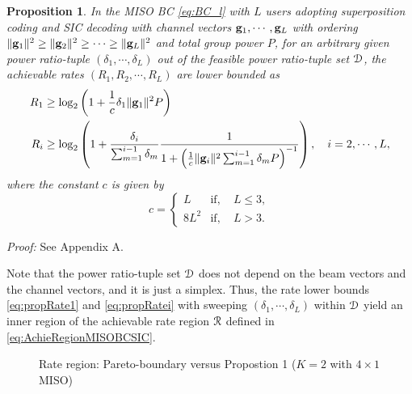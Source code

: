 \documentclass[11pt, draft, onecolumn ]{IEEEtran}
\def\scalefig#1{\epsfxsize #1\textwidth}
\newtheorem{proposition}{Proposition}
\begin{document}
\begin{proposition} \label{pro:proposition2}
    In the MISO BC \eqref{eq:BC_l} with $L$ users adopting superposition coding and SIC decoding with  channel vectors ${\bf g}_1, \cdots, {\bf g}_L$ with ordering
$\|{\bf g}_1\|^2 \geq \|{\bf g}_2\|^2 \geq \cdots  \geq \|{\bf g}_L\|^2$ and total group power $P$,  for an arbitrary given power ratio-tuple  $(\delta_1, \cdots, \delta_L)$ out of the feasible power ratio-tuple set ${\cal D}$, %
the achievable rates  $(R_1, R_2, \cdots, R_L)$   are lower bounded as
\begin{align}
    R_1 &\geq \log_2 \left( 1 + \frac{1}{c} \delta_1 \|{\bf g}_1\|^2 P \right)  \label{eq:propRate1}\\
    R_i &\geq \log_2 \left( 1 + \frac{\delta_i}{\sum_{m=1}^{i-1} \delta_m} \frac{1}{1 + \left(\frac{1}{c} \|{\bf g}_i\|^2\sum_{m=1}^{i-1} \delta_m P \right)^{-1}}\right),
    \quad i = 2, \cdots, L, \label{eq:propRatei}
\end{align}
 where the constant $c$ is given by
\begin{equation}  \label{eq:Prop1constanC}
   c = \left\{ \begin{array}{ll}
                  L & \mbox{if}, \quad L \leq 3, \\
                  8L^2 & \mbox{if}, \quad L > 3.
                \end{array}
    \right.
\end{equation}
\end{proposition}



{\em Proof:} See Appendix A.






Note that the power ratio-tuple set ${\cal D}$ does not
depend on the beam vectors and the channel vectors, and it is just a simplex. Thus, the rate lower bounds \eqref{eq:propRate1}
    and \eqref{eq:propRatei}  with sweeping $(\delta_1,\cdots,\delta_L)$ within ${\cal D}$
yield an inner region of  the achievable rate region  ${\cal R}$ defined in \eqref{eq:AchieRegionMISOBCSIC}.



\begin{figure}[ht]
\begin{psfrags}
    \centerline{ \scalefig{0.55}  }
    \caption{{Rate region: Pareto-boundary versus Propostion 1 ($K=2$ with $4\times 1$ MISO)}}
    \label{fig:rate_region}
\end{psfrags}
\end{figure}
\end{document}
